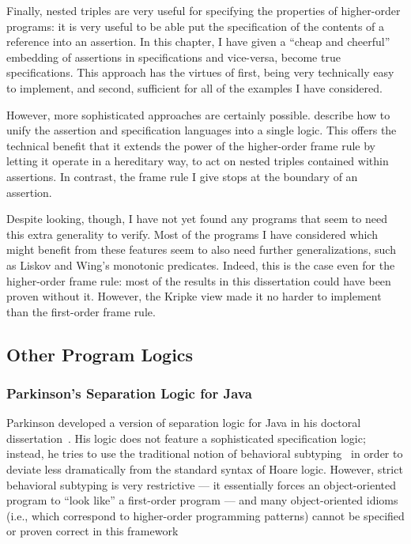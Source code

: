 Finally, nested triples are very useful for specifying the properties
of higher-order programs: it is very useful to be able put the
specification of the contents of a reference into an assertion.  In
this chapter, I have given a ``cheap and cheerful'' embedding of
assertions in specifications and vice-versa, become true
specifications. This approach has the virtues of first, being very
technically easy to implement, and second, sufficient for all of the
examples I have considered.

However, more sophisticated approaches are certainly
possible. \citet{nested-hoare-triples} describe how to unify the
assertion and specification languages into a single logic.  This
offers the technical benefit that it extends the power of the
higher-order frame rule by letting it operate in a hereditary way, to
act on nested triples contained within assertions. In contrast, the
frame rule I give stops at the boundary of an assertion. 

Despite looking, though, I have not yet found any programs that seem
to need this extra generality to verify. Most of the programs I have
considered which might benefit from these features seem to also need
further generalizations, such as Liskov and Wing's monotonic
predicates. Indeed, this is the case even for the higher-order frame
rule: most of the results in this dissertation could have been proven
without it. However, the Kripke view made it no harder to implement
than the first-order frame rule. 


\subsection{Other Program Logics}

\subsubsection{Parkinson's Separation Logic for Java}

Parkinson developed a version of separation logic for Java in his
doctoral dissertation~\cite{parkinson-thesis}. His logic does not
feature a sophisticated specification logic; instead, he tries to use
the traditional notion of behavioral
subtyping~\cite{behavioral-subtyping} in order to deviate less
dramatically from the standard syntax of Hoare logic. However, strict
behavioral subtyping is very restrictive --- it essentially forces an
object-oriented program to ``look like'' a first-order program --- and
many object-oriented idioms (i.e., which correspond to higher-order
programming patterns) cannot be specified or proven correct in this 
framework 

